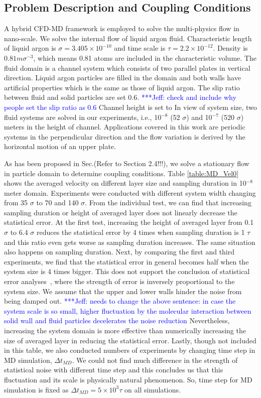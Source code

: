 \documentclass[preprint,12pt]{elsarticle}
\newcommand{\skonote}[1]{ {\textcolor{blue} { ***Jeff: #1 }}}
\newcommand{\skonote}[1]{}
\begin{document}
\subsection{Problem Description and Coupling Conditions}
A hybrid CFD-MD framework is employed to solve the multi-physics flow in nano-scale. We solve the internal flow of liquid argon fluid. Characteristic length of liquid argon is ${\sigma}=3.405{\times}10^{-10}$ and time scale is $\tau=2.2{\times}10^{-12}$. Density is $0.81m{\sigma}^{-3}$, which means 0.81 atoms are included in the characteristic volume.
The fluid domain is a channel system which consists of two parallel plates in vertical direction. Liquid argon particles are filled in the domain and both walls have artificial properties which is the same as those of liquid argon. The slip ratio between fluid and solid particles are set 0.6.\skonote{check and include why people set the slip ratio as 0.6} Channel height is set to In view of system size, two fluid systems are solved in our experiments, i.e., 10$^{-8}$ (52 $\sigma$) and 10$^{-7}$ (520 $\sigma$) meters in the height of channel. Applications covered in this work are periodic systems in the perpendicular direction and the flow variation is derived by the horizontal motion of an upper plate.

As has been proposed in Sec.(Refer to Section 2.4!!!), we solve a stationary flow in particle domain to determine coupling conditions. Table \ref{table:MD_Vel0} shows the averaged velocity on different layer size and sampling duration in 10$^{-8}$ meter domain. Experiments were conducted with different system width changing from 35 $\sigma$ to 70 and 140 $\sigma$. From the individual test, we can find that increasing sampling duration or height of averaged layer does not linearly decrease the statistical error. At the first test, increasing the height of averaged layer from 0.1 $\sigma$ to 6.4 $\sigma$ reduces the statistical error by 4 times when sampling duration is 1 $\tau$ and this ratio even gets worse as sampling duration increases. The same situation also happens on sampling duration. Next, by comparing the first and third experiments, we find that the statistical error in general becomes half when the system size is 4 times bigger. This does not support the conclusion of statistical error analyses~\cite{Hadjicon2},\cite{Time_Mechanism} where the strength of error is inversely proportional to the system size. We assume that the upper and lower walls hinder the noise from being damped out.\skonote{needs to change the above sentence: in case the system scale is so small, higher fluctuation by the molecular interaction between solid wall and fluid particles decelerates the noise reduction} Nevertheless, increasing the system domain is more effective than numerically increasing the size of averaged layer in reducing the statistical error. Lastly, though not included in this table, we also conducted numbers of experiments by changing time step in MD simulation, $\Delta t_{MD}$. We could not find much difference in the strength of statistical noise with different time step and this concludes us that this fluctuation and its scale is physically natural phenomenon. So, time step for MD simulation is fixed as $\Delta t_{MD}=5 \times 10^3 \tau$ on all simulations.
\end{document}
